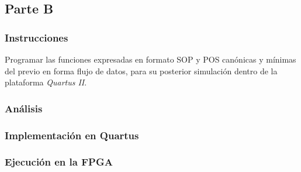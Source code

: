 \documentclass[../procedimientos.tex]{subfiles}
\begin{document}
\clearpage
\subsection{Parte B}
\subsubsection{Instrucciones}
\begin{em}
  Programar las funciones expresadas en formato SOP y POS canónicas y mínimas 
  del previo en forma flujo de datos, para su posterior simulación dentro de la plataforma
  \textit{Quartus II}.
\end{em}

\subsubsection{Análisis}\label{subs:analisis_b}
\subsubsection{Implementación en Quartus}\label{subs:b_imp}
\subsubsection{Ejecución en la FPGA}
\end{document}

